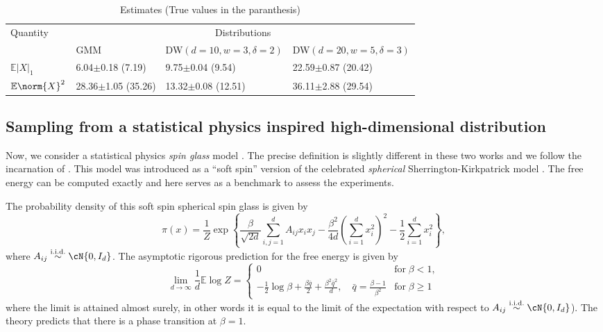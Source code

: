 \begin{table}
  \caption{Estimates (True values in the paranthesis)}
  \label{tab:estimates_tech}
  \centering
  \begin{tabular}{llll}
    \toprule
     \multirow{2}{*}{Quantity} & \multicolumn{3}{c}{Distributions} \\
     \cmidrule(r){2-4}
                               &    GMM          & DW$(d=10,w=3,\delta=2)$   & DW$(d=20,w=5,\delta=3)$  \\
     \midrule
             $\mathbb{E}{|X|_1}$     &    6.04$\pm$0.18 (7.19) & 9.75$\pm$0.04 (9.54)  &22.59$\pm$0.87 (20.42)    \\
              $\mathbb{E}{\norm{X}^2}$     &  28.36$\pm$1.05 (35.26) & 13.32$\pm$0.08 (12.51)  &36.11$\pm$2.88 (29.54)  \\
    \bottomrule
  \end{tabular}
\end{table}

\subsection{Sampling from a statistical physics inspired high-dimensional distribution}\label{sec:gaussian_spin_glass}
Now, we consider a statistical physics \textit{spin glass} model \cite{arous_aging_2001, barra_about_2014}. The precise definition is slightly different in these two works and we follow the incarnation of \cite{barra_about_2014}. This model was introduced as a ``soft spin'' version of the celebrated {\it spherical} Sherrington-Kirkpatrick model \cite{kosterlitz_spherical_1976}. The free energy can be computed exactly and here serves as a benchmark to assess the experiments. 

The probability density of this soft spin spherical spin glass is given by
\begin{equation*}
    \pi(x) = \frac{1}{Z}\exp\left\{\frac{\beta}{\sqrt{2d}}\sum_{i,j=1}^dA_{ij}x_ix_j-\frac{\beta^2}{4d}\left(\sum_{i=1}^dx_i^2\right)^2-\frac{1}{2}\sum_{i=1}^dx_i^2\right\},
\end{equation*}
where $A_{ij}\overset{\text{i.i.d.}}{\sim}\cN{0,I_d}$. The asymptotic rigorous prediction for the free energy \cite{barra_about_2014} is given by
$$
\lim_{d\rightarrow\infty}\frac{1}{d}\mathbb{E}\log Z = \begin{cases}
    0 &\text{for}\;\beta < 1,\\
    -\frac{1}{2}\log\beta + \frac{\beta\bar{q}}{2}+\frac{\beta^2\bar{q}^2}{d},\quad \bar{q} = \frac{\beta-1}{\beta^2} &\text{for}\;\beta \ge 1
\end{cases}
$$
where the limit is attained almost surely, in other words it is equal to the limit of the expectation with respect to $A_{ij}\overset{\text{i.i.d.}}{\sim}\cN{0,I_d}$).
The theory predicts that there is a phase transition at $\beta=1$.

